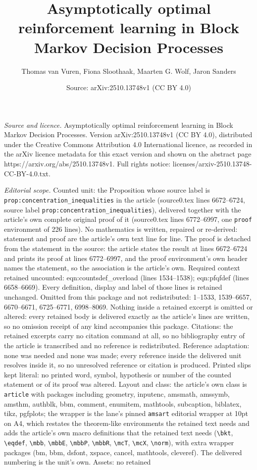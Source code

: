 \documentclass[10pt,a4paper]{amsart}
\title[Asymptotically optimal reinforcement learning in Block Marko]{Asymptotically optimal reinforcement learning in Block Markov Decision Processes}
\author{Thomas van Vuren, Fiona Sloothaak, Maarten G. Wolf, Jaron Sanders}
\date{Source: arXiv:2510.13748v1 (CC BY 4.0)}
\begin{document}
\maketitle

\noindent\emph{Source and licence.} Asymptotically optimal reinforcement learning in Block Markov Decision Processes. Version arXiv:2510.13748v1 (CC BY 4.0), distributed under the Creative Commons Attribution 4.0 International licence, as recorded in the arXiv licence metadata for this exact version and shown on the abstract page https://arxiv.org/abs/2510.13748v1. Full rights notice: licenses/arxiv-2510.13748-CC-BY-4.0.txt.\par\smallskip

\noindent\textit{Editorial scope.} Counted unit: the Proposition whose source label is \texttt{prop:concentration\_inequalities} in the article (source0.tex lines 6672--6724, source label \texttt{prop:concentration\_inequalities}), delivered together with the article's own complete original proof of it (source0.tex lines 6772--6997, one \texttt{proof} environment of 226 lines). No mathematics is written, repaired or re-derived: statement and proof are the article's own text line for line. The proof is detached from the statement in the source: the article states the result at lines 6672--6724 and prints its proof at lines 6772--6997, and the proof environment's own header names the statement, so the association is the article's own. Required context retained uncounted: eqn:countsdef\_overload (lines 1534--1538); eqn:pfqfdef (lines 6658--6669). Every definition, display and label of those lines is retained unchanged. Omitted from this package and not redistributed: 1--1533, 1539--6657, 6670--6671, 6725--6771, 6998--8069. Nothing inside a retained excerpt is omitted or altered: every retained body is delivered exactly as the article's lines are written, so no omission receipt of any kind accompanies this package. Citations: the retained excerpts carry no citation command at all, so no bibliography entry of the article is transcribed and no reference is redistributed. Reference adaptation: none was needed and none was made; every reference inside the delivered unit resolves inside it, so no unresolved reference or citation is produced. Printed slips kept literal: no printed word, symbol, hypothesis or number of the counted statement or of its proof was altered. Layout and class: the article's own class is \texttt{article} with packages including geometry, inputenc, amsmath, amssymb, amsthm, authblk, bbm, comment, enumitem, mathtools, subcaption, biblatex, tikz, pgfplots; the wrapper is the lane's pinned \texttt{amsart} editorial wrapper at 10pt on A4, which restates the theorem-like environments the retained text needs and adds the article's own macro definitions that the retained text needs (\texttt{\textbackslash bkt}, \texttt{\textbackslash eqdef}, \texttt{\textbackslash mbb}, \texttt{\textbackslash mbbE}, \texttt{\textbackslash mbbP}, \texttt{\textbackslash mbbR}, \texttt{\textbackslash mcT}, \texttt{\textbackslash mcX}, \texttt{\textbackslash norm}), with extra wrapper packages (bm, bbm, dsfont, xspace, cancel, mathtools, cleveref). The delivered numbering is the unit's own. Assets: no retained 
\end{document}
